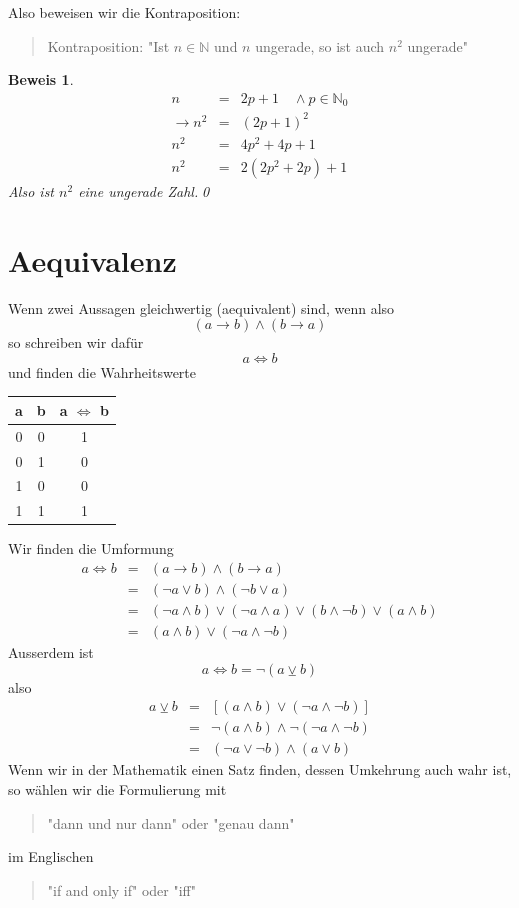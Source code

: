 \documentclass{report}
\newtheorem{myproof}{Beweis}
\begin{document}
Also beweisen wir die Kontraposition:
\begin{quote}{Kontraposition}: "Ist $n \in \mathbb{N}$ und $n$ ungerade, so ist auch $n^2$ ungerade"\end{quote}
\begin{myproof}\begin{eqnarray} 
n &=& 2p + 1 \quad \land p \in \mathbb{N}_0 \nonumber \\
\to n^2 &=& (2p + 1)^2 \nonumber \\
n^2 &=& 4p^2 + 4p + 1 \nonumber \\
n^2 &=& 2 (2p^2 + 2p) + 1\label{eq:nungerade} \end{eqnarray}
Also ist $n^2$ eine ungerade Zahl.\qed\end{myproof}

\section{Aequivalenz}
Wenn zwei Aussagen gleichwertig (aequivalent) sind, wenn also
\begin{equation}(a \to b) \land (b \to a)\end{equation}
so schreiben wir dafür
\begin{equation}a \iff b\end{equation}
und finden die Wahrheitswerte
\begin{center}\begin{tabular}{c c | c}
a & b & a \(\iff\) b\\
\hline
0 & 0 & 1 \\
0 & 1 & 0 \\
1 & 0 & 0 \\
1 & 1 & 1 \\
\end{tabular}\end{center}
Wir finden die Umformung
\begin{eqnarray}
a \iff b &=& (a \to b) \land (b \to a)\nonumber \\
&=& (\lnot a \lor b) \land (\lnot b \lor a)\nonumber \\
&=& (\lnot a \land b) \lor (\lnot a \land a) \lor (b \land \lnot b) \lor (a \land b) \nonumber \\
&=& (a \land b) \lor (\lnot a \land \lnot b)
\end{eqnarray}
Ausserdem ist 
\begin{equation}a \iff b = \lnot (a \veebar b)\end{equation}
also
\begin{eqnarray}a \veebar b &=& [(a \land b) \lor (\lnot a \land \lnot b)] \nonumber \\
&=&\lnot(a \land b) \land \lnot (\lnot a \land \lnot b) \nonumber \\
&=&(\lnot a \lor \lnot b) \land (a \lor b)\end{eqnarray}
Wenn wir in der Mathematik einen Satz finden, dessen Umkehrung auch wahr ist, so wählen wir die Formulierung mit
\begin{quote}"dann und nur dann" oder "genau dann"\end{quote}
im Englischen
\begin{quote}"if and only if" oder "iff"\end{quote}
\end{document}

